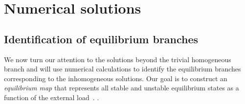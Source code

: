 
\section{Numerical solutions}
\label{sec:numerics}
\subsection{Identification of equilibrium branches}

We now turn our attention to the solutions beyond the trivial homogeneous branch and will use numerical calculations to identify the equilibrium branches corresponding to the inhomogeneous solutions. Our goal is to construct an \emph{equilibrium map} that represents all stable and unstable equilibrium states as a function of the external load~\cite{Pattamatta2014-pn}.
.

